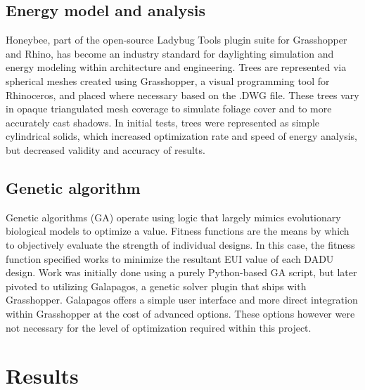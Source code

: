 \documentclass[sagev,doublespace,times,Review]{sagej}
\begin{document}
\subsection{Energy model and analysis}
Honeybee, part of the open-source Ladybug Tools plugin suite for Grasshopper and Rhino, has become an industry standard for daylighting simulation and energy modeling within architecture and engineering. 
Trees are represented via spherical meshes created using Grasshopper, a visual programming tool for Rhinoceros, and placed where necessary based on the .DWG file. These trees vary in opaque triangulated mesh coverage to simulate foliage cover and to more accurately cast shadows. In initial tests, trees were represented as simple cylindrical solids, which increased optimization rate and speed of energy analysis, but decreased validity and accuracy of results.

\subsection{Genetic algorithm}
Genetic algorithms (GA) operate using logic that largely mimics evolutionary biological models to optimize a value. Fitness functions are the means by which to objectively evaluate the strength of individual designs. In this case, the fitness function specified works to minimize the resultant EUI value of each DADU design. Work was initially done using a purely Python-based GA script, but later pivoted to utilizing Galapagos, a genetic solver plugin that ships with Grasshopper. Galapagos offers a simple user interface and more direct integration within Grasshopper at the cost of advanced options. These options however were not necessary for the level of optimization required within this project.

\section{Results}
\end{document}
